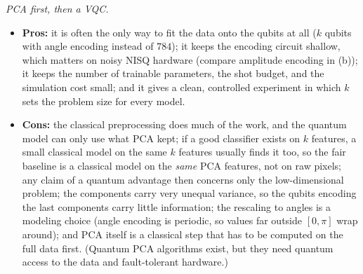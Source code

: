 \documentclass[11pt]{article}
\begin{document}
\noindent\emph{PCA first, then a VQC.}
\begin{itemize}
\item \textbf{Pros:} it is often the only way to fit the data onto the qubits at all ($k$ qubits with angle encoding instead of $784$); it keeps the encoding circuit shallow, which matters on noisy NISQ hardware (compare amplitude encoding in (b)); it keeps the number of trainable parameters, the shot budget, and the simulation cost small; and it gives a clean, controlled experiment in which $k$ sets the problem size for every model.
\item \textbf{Cons:} the classical preprocessing does much of the work, and the quantum model can only use what PCA kept; if a good classifier exists on $k$ features, a small classical model on the same $k$ features usually finds it too, so the fair baseline is a classical model on the \emph{same} PCA features, not on raw pixels; any claim of a quantum advantage then concerns only the low-dimensional problem; the components carry very unequal variance, so the qubits encoding the last components carry little information; the rescaling to angles is a modeling choice (angle encoding is periodic, so values far outside $[0,\pi]$ wrap around); and PCA itself is a classical step that has to be computed on the full data first. (Quantum PCA algorithms exist, but they need quantum access to the data and fault-tolerant hardware.)
\end{itemize}
\end{document}
